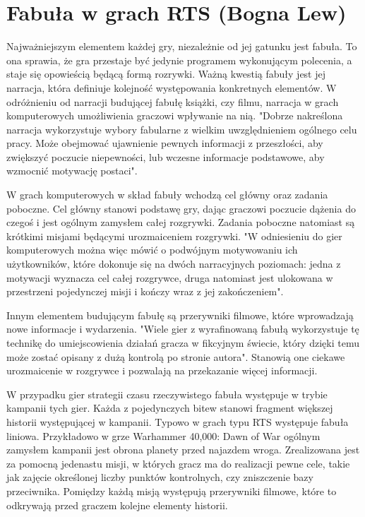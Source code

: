 \section{Fabuła w grach RTS (Bogna Lew)}\label{s:fabula}
Najważniejszym elementem każdej gry, niezależnie od jej gatunku jest fabuła. To ona sprawia, że gra przestaje być
jedynie programem wykonującym polecenia, a staje się opowieścią będącą formą rozrywki. Ważną kwestią fabuły jest jej
narracja, która definiuje kolejność występowania konkretnych elementów. W odróżnieniu od narracji budującej
fabułę książki, czy filmu, narracja w grach komputerowych umożliwienia graczowi wpływanie na nią. "Dobrze nakreślona
narracja wykorzystuje wybory fabularne z wielkim uwzględnieniem ogólnego celu pracy. Może obejmować ujawnienie pewnych
informacji z przeszłości, aby zwiększyć poczucie niepewności, lub wczesne informacje podstawowe, aby wzmocnić motywację
postaci"\cite{level_design}.

W grach komputerowych w skład fabuły wchodzą cel główny oraz zadania poboczne. Cel główny stanowi podstawę gry, dając
graczowi poczucie dążenia do czegoś i jest ogólnym zamysłem całej rozgrywki. Zadania poboczne natomiast są krótkimi
misjami będącymi urozmaiceniem rozgrywki. "W odniesieniu do gier komputerowych można więc mówić o podwójnym motywowaniu
ich użytkowników, które dokonuje się na dwóch narracyjnych poziomach: jedna z motywacji wyznacza cel całej
rozgrywce, druga natomiast jest ulokowana w przestrzeni pojedynczej misji i kończy wraz z jej zakończeniem"\cite{olbrzymwcieniu}.

Innym elementem budującym fabułę są przerywniki filmowe, które wprowadzają nowe informacje i wydarzenia. "Wiele gier z
wyrafinowaną fabułą wykorzystuje tę technikę do umiejscowienia działań gracza w fikcyjnym świecie, który dzięki temu
może zostać opisany z dużą kontrolą po stronie autora"\cite{understanding_games}. Stanowią one ciekawe urozmaicenie w rozgrywce i
pozwalają na przekazanie więcej informacji.

W przypadku gier strategii czasu rzeczywistego fabuła występuje w trybie kampanii tych gier. Każda z pojedynczych bitew
stanowi fragment większej historii występującej w kampanii. Typowo w grach typu RTS występuje fabuła liniowa.
Przykładowo w grze Warhammer 40,000: Dawn of War ogólnym zamysłem kampanii jest obrona planety przed najazdem wroga.
Zrealizowana jest za pomocną jedenastu misji, w których gracz ma do realizacji pewne cele, takie jak zajęcie określonej
liczby punktów kontrolnych, czy zniszczenie bazy przeciwnika. Pomiędzy każdą misją występują przerywniki filmowe, które
to odkrywają przed graczem kolejne elementy historii.

